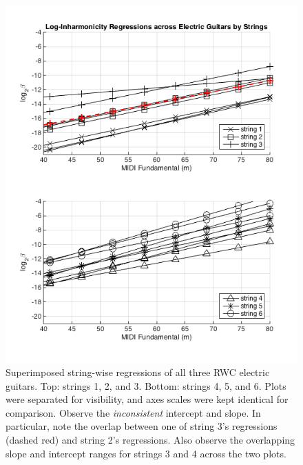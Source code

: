 \documentclass[12pt]{cmuthesis}
\begin{document}
\begin{figure}[!htbp] 
\label{fig:traj-compare-eg}
\centering
\includegraphics[scale=0.75]{traj-compare-eg}
\caption{Superimposed string-wise regressions of all three RWC electric guitars. Top: strings 1, 2, and 3. Bottom: strings 4, 5, and 6. Plots were separated for visibility, and axes scales were kept identical for comparison. Observe the \textit{inconsistent} intercept and slope. In particular, note the overlap between one of string 3's regressions (dashed red) and string 2's regressions. Also observe the overlapping slope and intercept ranges for strings 3 and 4 across the two plots.}
\end{figure}
\end{document}
